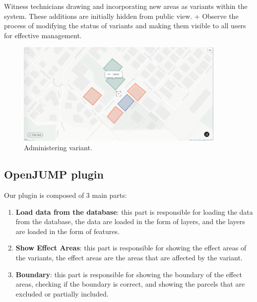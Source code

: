 Witness technicians drawing and incorporating new areas as variants within the system.
These additions are initially hidden from public view.
+ Observe the process of modifying the status of variants and making them visible to all users for effective management.
\begin{figure}[H]
    \centering
    \includegraphics[width=0.9\textwidth]{res/web/4-draw polygons}
    \caption{Administering variant.}
    \label{fig:web-create-var}
\end{figure}




\subsection{OpenJUMP plugin}\label{subsec:fa-openjump-plugin}
Our plugin is composed of 3 main parts:
\begin{enumerate}
    \item \textbf{Load data from the database}: this part is responsible for loading the data from the database, the data are loaded in the form of layers, and the layers are loaded in the form of features.
    \item \textbf{Show Effect Areas}: this part is responsible for showing the effect areas of the variants, the effect areas are the areas that are affected by the variant.
    \item \textbf{Boundary}: this part is responsible for showing the boundary of the effect areas, checking if the boundary is correct, and showing the parcels that are excluded or partially included.
\end{enumerate}

